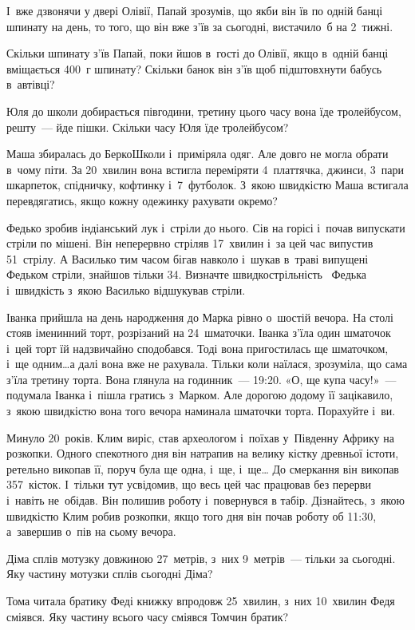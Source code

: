 І~вже дзвонячи у двері Олівії, Папай зрозумів, що якби він їв по одній
банці шпинату на день, то того, що він вже з’їв за сьогодні,
вистачило~б на 2~тижні.

Скільки шпинату з’їв Папай, поки йшов в~гості до Олівії, якщо в~одній
банці вміщається 400~г шпинату?
Скільки банок він з’їв щоб підштовхнути бабусь в~автівці?


\problem
Юля до школи добирається півгодини,
третину цього часу вона їде тролейбусом, решту~--- йде пішки.
Скільки часу Юля їде тролейбусом?


\problem
Маша збиралась до БеркоШколи і~приміряла одяг.
Але довго не могла обрати в~чому піти.
За 20~хвилин вона встигла переміряти 4~платтячка, джинси, 3~пари шкарпеток,
спідничку, кофтинку і~7~футболок.
З~якою швидкістю Маша встигала перевдягатись,
якщо кожну одежинку рахувати окремо?


\problem
Федько зробив індіанський лук і~стріли до нього.
Сів на горісі і~почав випускати стріли по мішені.
Він неперервно стріляв 17~хвилин і~за цей час випустив 51~стрілу.
А Василько тим часом бігав навколо і~шукав в~траві випущені Федьком стріли,
знайшов тільки 34.
Визначте швидкострільність  Федька і~швидкість з~якою Василько
відшукував стріли.


\problem
Іванка прийшла на день народження до Марка рівно о~шостій вечора.
На столі стояв іменинний торт, розрізаний на 24~шматочки.
Іванка з’їла один шматочок і~цей торт їй надзвичайно сподобався.
Тоді вона пригостилась ще шматочком, і~ще одним\ldots а далі вона вже не рахувала.
Тільки коли наїлася, зрозуміла, що сама з’їла третину торта.
Вона глянула на годинник~--- 19:20.
«О, ще купа часу!»~--- подумала Іванка і~пішла гратись з~Марком.
Але дорогою додому її зацікавило, з~якою швидкістю вона того
вечора наминала шматочки торта. Порахуйте і~ви.


\problem
Минуло 20~років. Клим виріс, став археологом і~поїхав у~Південну Африку
на розкопки. Одного спекотного дня він натрапив на велику кістку
древньої істоти, ретельно викопав її, поруч була ще одна, і~ще, і~ще\ldots
До смеркання він викопав 357~кісток. І~тільки тут усвідомив, що весь
цей час працював без перерви і~навіть не~обідав. Він полишив роботу
і~повернувся в табір. Дізнайтесь, з~якою швидкістю Клим робив розкопки,
якщо того дня він почав роботу об 11:30, а~завершив о~пів на сьому вечора.


\problem
Діма сплів мотузку довжиною 27~метрів, з~них 9~метрів~--- тільки за сьогодні.
Яку частину мотузки сплів сьогодні Діма?


\problem
Тома читала братику Феді книжку впродовж 25~хвилин,
з~них 10~хвилин Федя сміявся.
Яку частину всього часу сміявся Томчин братик?
